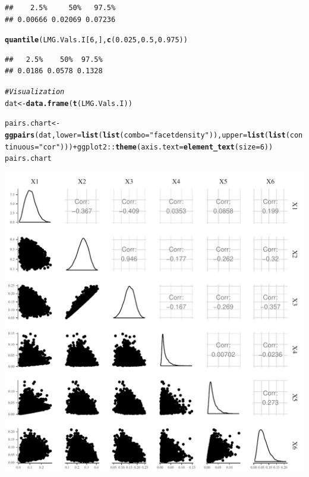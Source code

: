 \documentclass[11pt,a4paper,twoside]{book}
\makeatletter
\def\maxwidth{ %
  \ifdim\Gin@nat@width>\linewidth
    \linewidth
  \else
    \Gin@nat@width
  \fi
}
\newcommand{\hlnum}[1]{\textcolor[rgb]{0.686,0.059,0.569}{#1}}%
\newcommand{\hlstr}[1]{\textcolor[rgb]{0.192,0.494,0.8}{#1}}%
\newcommand{\hlcom}[1]{\textcolor[rgb]{0.678,0.584,0.686}{\textit{#1}}}%
\newcommand{\hlopt}[1]{\textcolor[rgb]{0,0,0}{#1}}%
\newcommand{\hlstd}[1]{\textcolor[rgb]{0.345,0.345,0.345}{#1}}%
\newcommand{\hlkwb}[1]{\textcolor[rgb]{0.69,0.353,0.396}{#1}}%
\newcommand{\hlkwc}[1]{\textcolor[rgb]{0.333,0.667,0.333}{#1}}%
\newcommand{\hlkwd}[1]{\textcolor[rgb]{0.737,0.353,0.396}{\textbf{#1}}}%
\newenvironment{kframe}{%
 \def\at@end@of@kframe{}%
 \ifinner\ifhmode%
  \def\at@end@of@kframe{\end{minipage}}%
  \begin{minipage}{\columnwidth}%
 \fi\fi%
 \def\FrameCommand##1{\hskip\@totalleftmargin \hskip-\fboxsep
 \colorbox{shadecolor}{##1}\hskip-\fboxsep
     \hskip-\linewidth \hskip-\@totalleftmargin \hskip\columnwidth}%
 \MakeFramed {\advance\hsize-\width
   \@totalleftmargin\z@ \linewidth\hsize
   \@setminipage}}%
 {\par\unskip\endMakeFramed%
 \at@end@of@kframe}
\newenvironment{knitrout}{}{} %
\makeatother
\begin{document}
\begin{knitrout}
\begin{kframe}
\begin{alltt}
\end{alltt}
\begin{verbatim}
##    2.5%     50%   97.5% 
## 0.00666 0.02069 0.07236
\end{verbatim}
\begin{alltt}
\hlkwd{quantile}\hlstd{(LMG.Vals.I[}\hlnum{6}\hlstd{,],} \hlkwd{c}\hlstd{(}\hlnum{0.025}\hlstd{,} \hlnum{0.5}\hlstd{,} \hlnum{0.975}\hlstd{))}
\end{alltt}
\begin{verbatim}
##   2.5%    50%  97.5% 
## 0.0186 0.0578 0.1328
\end{verbatim}
\begin{alltt}
\hlcom{#Visualization}
\hlstd{dat} \hlkwb{<-} \hlkwd{data.frame}\hlstd{(}\hlkwd{t}\hlstd{(LMG.Vals.I))}

\hlstd{pairs.chart} \hlkwb{<-} \hlkwd{ggpairs}\hlstd{(dat,} \hlkwc{lower} \hlstd{=} \hlkwd{list}\hlstd{(}\hlkwd{list}\hlstd{(}\hlkwc{combo} \hlstd{=} \hlstr{"facetdensity"}\hlstd{)),} \hlkwc{upper} \hlstd{=} \hlkwd{list}\hlstd{(}\hlkwd{list}\hlstd{(}\hlkwc{continuous} \hlstd{=} \hlstr{"cor"}\hlstd{)))} \hlopt{+} \hlstd{ggplot2}\hlopt{::}\hlkwd{theme}\hlstd{(}\hlkwc{axis.text} \hlstd{=} \hlkwd{element_text}\hlstd{(}\hlkwc{size} \hlstd{=} \hlnum{6}\hlstd{))}
\hlstd{pairs.chart}
\end{alltt}
\end{kframe}
\includegraphics[width=\maxwidth]{figure/ch03_figreal_data_LMG-1} 

\end{knitrout}
\end{document}
